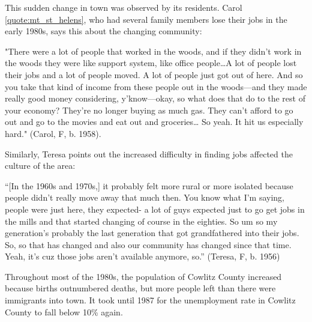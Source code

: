 This sudden change in town was observed by its residents. Carol \ref{quote:mt_st_helens}, who had several family members lose their jobs in the early 1980s, says this about the changing community:
\begin{num_quote}
    "There were a lot of people that worked in the woods, and if they didn't work in the woods they were like support system, like office people\ldots A lot of people lost their jobs and a lot of people moved. A lot of people just got out of here. And so you take that kind of income from these people out in the woods—and they made really good money considering, y'know—okay, so what does that do to the rest of your economy? They're no longer buying as much gas. They can't afford to go out and go to the movies and eat out and groceries… So yeah. It hit us especially hard." (Carol, F, b. 1958).
\label{quote:mt_st_helens}
\end{num_quote}
Similarly, Teresa points out the increased difficulty in finding jobs affected the culture of the area:
\begin{num_quote}
    ``[In the 1960s and 1970s,] it probably felt more rural or more isolated because people didn't really move away that much then. You know what I'm saying, people were just here, they expected- a lot of guys expected just to go get jobs in the mills and that started changing of course in the eighties. So um so my generation's probably the last generation that got grandfathered into their jobs. So, so that has changed and also our community has changed since that time. Yeah, it's cuz those jobs aren't available anymore, so.'' (Teresa, F, b. 1956)
\label{quote:changed_culture}
\end{num_quote}
Throughout most of the 1980s, the population of Cowlitz County increased because births outnumbered deaths, but more people left than there were immigrants into town. It took until 1987 for the unemployment rate in Cowlitz County to fall below 10\% again.

